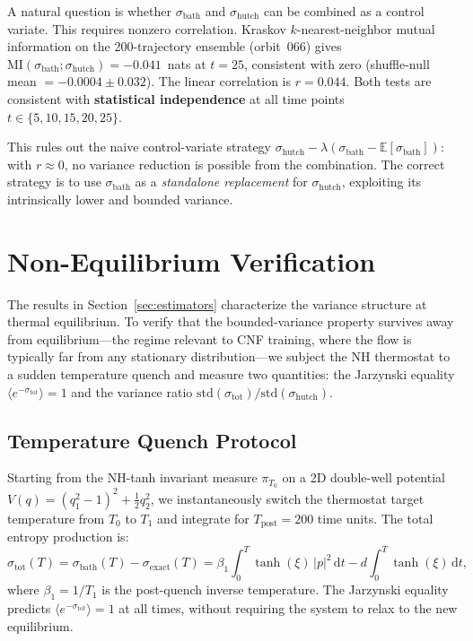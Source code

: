 \documentclass[11pt]{article}
\newcommand{\E}{\mathbb{E}}
\newcommand{\dd}{\mathrm{d}}
\newcommand{\sbath}{\sigma_{\mathrm{bath}}}
\newcommand{\shutch}{\sigma_{\mathrm{hutch}}}
\newcommand{\sexact}{\sigma_{\mathrm{exact}}}
\newcommand{\stot}{\sigma_{\mathrm{tot}}}
\begin{document}
A natural question is whether $\sbath$ and $\shutch$ can be combined as a
control variate. This requires nonzero correlation. Kraskov $k$-nearest-neighbor
mutual information \citep{kraskov2004estimating} on the 200-trajectory ensemble
(orbit~066) gives $\mathrm{MI}(\sbath; \shutch) = -0.041$~nats at $t{=}25$,
consistent with zero (shuffle-null mean $= -0.0004 \pm 0.032$). The linear
correlation is $r = 0.044$. Both tests are consistent with \textbf{statistical
independence} at all time points $t \in \{5, 10, 15, 20, 25\}$.

This rules out the naive control-variate strategy
$\shutch - \lambda(\sbath - \E[\sbath])$: with $r \approx 0$, no variance
reduction is possible from the combination. The correct strategy is to use
$\sbath$ as a \emph{standalone replacement} for $\shutch$, exploiting its
intrinsically lower and bounded variance.

\section{Non-Equilibrium Verification}
\label{sec:noneq}

The results in Section~\ref{sec:estimators} characterize the variance structure
at thermal equilibrium. To verify that the bounded-variance property survives
away from equilibrium---the regime relevant to CNF training, where the flow is
typically far from any stationary distribution---we subject the NH thermostat to
a sudden temperature quench and measure two quantities: the Jarzynski equality
$\langle e^{-\stot} \rangle = 1$ and the variance ratio
$\text{std}(\stot) / \text{std}(\shutch)$.

\subsection{Temperature Quench Protocol}

Starting from the NH-tanh invariant measure $\pi_{T_0}$ on a 2D double-well
potential $V(q) = (q_1^2 - 1)^2 + \tfrac{1}{2}q_2^2$, we instantaneously
switch the thermostat target temperature from $T_0$ to $T_1$ and integrate for
$T_{\mathrm{post}} = 200$ time units. The total entropy production is:
\begin{equation}
  \stot(T) = \sbath(T) - \sexact(T)
  = \beta_1 \int_0^T \tanh(\xi)\,|p|^2\,\dd t
    - d \int_0^T \tanh(\xi)\,\dd t,
  \label{eq:sigma_tot}
\end{equation}
where $\beta_1 = 1/T_1$ is the post-quench inverse temperature. The Jarzynski
equality \citep{jarzynski1997nonequilibrium} predicts
$\langle e^{-\stot} \rangle = 1$ at all times, without requiring the system
to relax to the new equilibrium.
\end{document}
